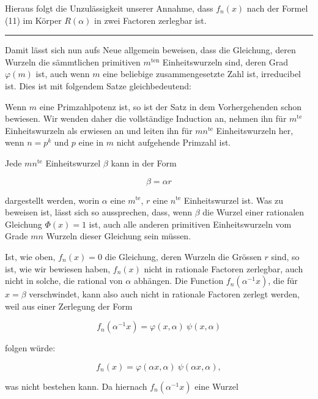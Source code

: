 Hieraus folgt die Unzulässigkeit unserer Annahme, dass $f_n(x)$ nach der Formel (11) im Körper $R(\alpha)$ in zwei Factoren zerlegbar ist.

\begin{center}
\rule{4cm}{0.4pt}
\end{center}

Damit lässt sich nun aufs Neue allgemein beweisen, dass die Gleichung, deren Wurzeln die sämmtlichen primitiven $m^{\text{ten}}$ Einheitswurzeln sind, deren Grad $\varphi(m)$ ist, auch wenn $m$ eine beliebige zusammengesetzte Zahl ist, irreducibel ist. Dies ist mit folgendem Satze gleichbedeutend:


Wenn $m$ eine Primzahlpotenz ist, so ist der Satz in dem Vorhergehenden schon bewiesen. Wir wenden daher die vollständige Induction an, nehmen ihn für $m^{\text{te}}$ Einheitswurzeln als erwiesen an und leiten ihn für $mn^{\text{te}}$ Einheitswurzeln her, wenn $n = p^k$ und $p$ eine in $m$ nicht aufgehende Primzahl ist.

Jede $mn^{\text{te}}$ Einheitswurzel $\beta$ kann in der Form

\[
\beta = \alpha r
\]

dargestellt werden, worin $\alpha$ eine $m^{\text{te}}$, $r$ eine $n^{\text{te}}$ Einheitswurzel ist. Was zu beweisen ist, lässt sich so aussprechen, dass, wenn $\beta$ die Wurzel einer rationalen Gleichung $\Phi(x) = 1$ ist, %
auch alle anderen primitiven Einheitswurzeln vom Grade $mn$ Wurzeln dieser Gleichung sein müssen.

Ist, wie oben, $f_n(x) = 0$ die Gleichung, deren Wurzeln die Grössen $r$ sind, so ist, wie wir bewiesen haben, $f_n(x)$ nicht in rationale Factoren zerlegbar, auch nicht in solche, die rational von $\alpha$ abhängen. Die Function $f_n(\alpha^{-1}x)$, die für $x = \beta$ verschwindet, kann also auch nicht in rationale Factoren zerlegt werden, weil aus einer Zerlegung der Form

\[
f_n(\alpha^{-1}x) = \varphi(x,\alpha)\ \psi(x,\alpha)
\]

folgen würde:

\[
f_n(x) = \varphi(\alpha x,\alpha)\ \psi(\alpha x,\alpha),
\]

was nicht bestehen kann. Da hiernach $f_n(\alpha^{-1}x)$ eine Wurzel
